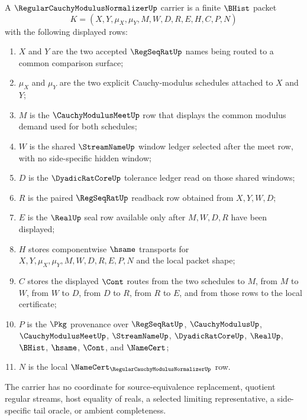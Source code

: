 \begin{definition}
\label{def:regular-cauchy-modulus-normalizer-carrier}
A $\RegularCauchyModulusNormalizerUp$ carrier is a finite $\BHist$ packet
$$
K=(X,Y,\mu_X,\mu_Y,M,W,D,R,E,H,C,P,N)
$$
with the following displayed rows:
\begin{enumerate}
\item $X$ and $Y$ are the two accepted $\RegSeqRatUp$ names being routed to a common comparison surface;
\item $\mu_X$ and $\mu_Y$ are the two explicit Cauchy-modulus schedules attached to $X$ and $Y$;
\item $M$ is the $\CauchyModulusMeetUp$ row that displays the common modulus demand used for both schedules;
\item $W$ is the shared $\StreamNameUp$ window ledger selected after the meet row, with no side-specific hidden window;
\item $D$ is the $\DyadicRatCoreUp$ tolerance ledger read on those shared windows;
\item $R$ is the paired $\RegSeqRatUp$ readback row obtained from $X,Y,W,D$;
\item $E$ is the $\RealUp$ seal row available only after $M,W,D,R$ have been displayed;
\item $H$ stores componentwise $\hsame$ transports for $X,Y,\mu_X,\mu_Y,M,W,D,R,E,P,N$ and the local packet shape;
\item $C$ stores the displayed $\Cont$ routes from the two schedules to $M$, from $M$ to $W$, from $W$ to $D$, from $D$ to $R$, from $R$ to $E$, and from those rows to the local certificate;
\item $P$ is the $\Pkg$ provenance over $\RegSeqRatUp$, $\CauchyModulusUp$, $\CauchyModulusMeetUp$, $\StreamNameUp$, $\DyadicRatCoreUp$, $\RealUp$, $\BHist$, $\hsame$, $\Cont$, and $\NameCert$;
\item $N$ is the local $\NameCert_{\RegularCauchyModulusNormalizerUp}$ row.
\end{enumerate}
The carrier has no coordinate for source-equivalence replacement, quotient regular streams, host equality of reals, a selected limiting representative, a side-specific tail oracle, or ambient completeness.
\end{definition}

